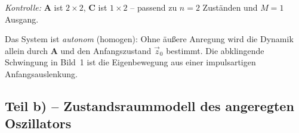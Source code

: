 \begin{beispiel}
\textit{Kontrolle:} $\mathbf{A}$ ist $2\times 2$, $\mathbf{C}$ ist $1\times 2$ --
passend zu $n=2$ Zuständen und $M=1$ Ausgang. \checkmark

Das System ist \emph{autonom} (homogen): Ohne äußere Anregung wird die Dynamik
allein durch $\mathbf{A}$ und den Anfangszustand $\vec{z}_0$ bestimmt. Die
abklingende Schwingung in Bild~1 ist die Eigenbewegung aus einer impulsartigen
Anfangsauslenkung.

\end{beispiel}

\subsection*{Teil b) – Zustandsraummodell des angeregten Oszillators}

